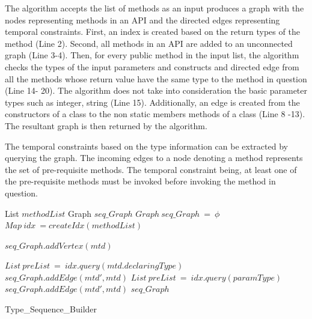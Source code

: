 The algorithm accepts the list of methods as an input produces a graph with
the nodes representing methods in an API and the directed edges representing temporal constraints.
First, an index is created based on the return types of the method (Line 2).
Second, all methods in an API are added to an unconnected graph (Line 3-4).
Then, for every public method in the input list, the algorithm checks the types
of the input parameters and constructs and directed edge from all the methods whose return value
have the same type to the method in question (Line 14- 20).
The algorithm does not take into consideration the basic parameter types such as integer, string (Line 15).
Additionally, an edge is created from the constructors of a class to the non static members methods of a class (Line 8 -13).
The resultant graph is then returned by the algorithm.


The temporal constraints based on the type information can be extracted by querying the graph. 
The incoming edges to a node denoting a method represents the set of pre-requisite methods.
The temporal constraint being, at least one of the pre-requisite methods must be invoked before invoking the method in question.


\begin{algorithm}[t!]
\begin{algorithmic}[1]
\begin{scriptsize}
\REQUIRE List $methodList$ 
\ENSURE Graph $seq\_Graph$
\STATE $Graph\ seq\_Graph\ =\ \phi$
\STATE $Map\ idx\ = createIdx(methodList)$

	\STATE $seq\_Graph.addVertex(mtd)$
\ENDFOR

			\STATE $List\ preList\ =\ idx.query(mtd.declaringType)$
				\STATE $seq\_Graph.addEdge(mtd',mtd)$
			\ENDFOR
		\ENDIF
				\STATE $List\ preList\ =\ idx.query(paramType)$
					\STATE $seq\_Graph.addEdge(mtd',mtd)$
				\ENDFOR				
			\ENDIF
		\ENDFOR
	\ENDIF
\ENDFOR
\RETURN $seq\_Graph$
\end{scriptsize}
\end{algorithmic}
\caption{Type\_Sequence\_Builder}
\label{alg:TypeAnalysis}
\end{algorithm} 

